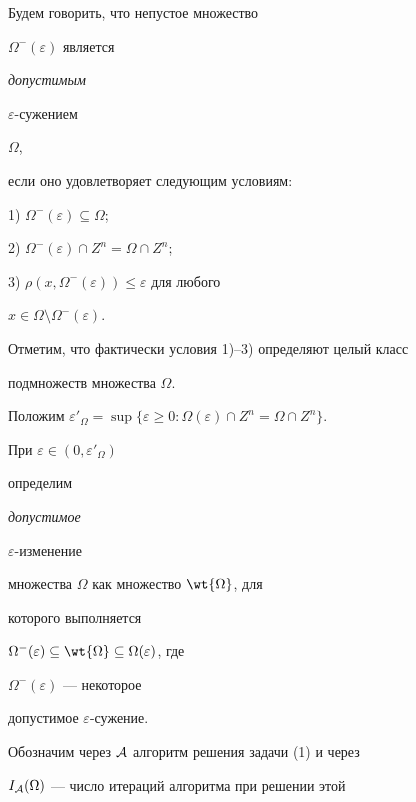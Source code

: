 Будем говорить, что непустое множество


$\Omega^{-}( \varepsilon)$ является {\it допустимым


$ \varepsilon$-сужением} $\Omega$,


если оно удовлетворяет следующим условиям:





1) $ \Omega^{-}( \varepsilon) \subseteq \Omega$;





2) $ \Omega^{-}( \varepsilon) \cap Z^{n} = \Omega \cap Z^{n}$;





3) $ \rho( x, \Omega^{-}( \varepsilon)) \leq \varepsilon $ для любого


$x \in \Omega \setminus  \Omega^{-}( \varepsilon)$.





\noindent{}Отметим, что фактически условия 1)--3) определяют целый класс


подмножеств множества $ \Omega$.





Положим $\varepsilon'_{ \Omega} = \sup \{ \varepsilon \geq 0:


\Omega( \varepsilon) \cap


Z^{n} = \Omega \cap Z^{n} \}$. 


При $\varepsilon \in (0, \varepsilon'_{ \Omega})$ 


определим { \it допустимое 


$\varepsilon$-изменение}


множества $\Omega$ как множество $ \wt{ \Omega}$, для


которого выполняется


$\Omega^{-}( \varepsilon) \subseteq \wt{ \Omega}


\subseteq \Omega( \varepsilon)$, где


$ \Omega^{-}( \varepsilon)$ --- некоторое


допустимое $ \varepsilon$-сужение.








Обозначим через ${\cal A}$  алгоритм решения задачи  (1)  и через


$I_{ \cal A}( \Omega)$ --- число итераций алгоритма  при решении  этой 


